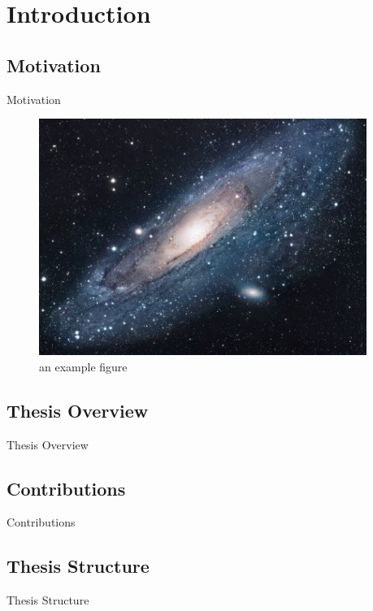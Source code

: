 \chapter{Introduction}
\label{chapter:introduction}

\graphicspath{{chapter1/figs/}}


\section{Motivation}
\label{introduction:sec1.motivation}


Motivation


\begin{figure}[!ht]
	\centering
	\includegraphics[width=0.95\textwidth]{universe.jpeg}
	\vspace{0.1cm}
	\caption[Caption]{an example figure}
	\label{fig:label}
\end{figure}

\section{Thesis Overview}
\label{introduction:sec2.overview}

Thesis Overview
\section{Contributions}
\label{introduction:sec3.contributions}

Contributions

\section{Thesis Structure}
\label{introduction:sec3.structure}

Thesis Structure